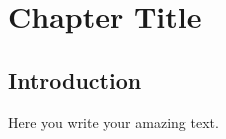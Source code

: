 \chapter{Chapter Title}
\label{chp:give-it-a-nice-label}


\section{Introduction}

Here you write your amazing text.
